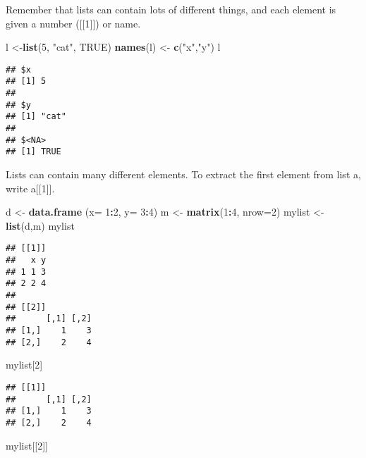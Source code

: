 \documentclass[
]{article}
\newenvironment{Shaded}{\begin{snugshade}}{\end{snugshade}}
\newcommand{\DataTypeTok}[1]{\textcolor[rgb]{0.13,0.29,0.53}{#1}}
\newcommand{\DecValTok}[1]{\textcolor[rgb]{0.00,0.00,0.81}{#1}}
\newcommand{\KeywordTok}[1]{\textcolor[rgb]{0.13,0.29,0.53}{\textbf{#1}}}
\newcommand{\NormalTok}[1]{#1}
\newcommand{\OperatorTok}[1]{\textcolor[rgb]{0.81,0.36,0.00}{\textbf{#1}}}
\newcommand{\OtherTok}[1]{\textcolor[rgb]{0.56,0.35,0.01}{#1}}
\newcommand{\StringTok}[1]{\textcolor[rgb]{0.31,0.60,0.02}{#1}}
\begin{document}
Remember that lists can contain lots of different things, and each
element is given a number ({[}{[}1{]}{]}) or name.

\begin{Shaded}
\begin{Highlighting}[]
\NormalTok{l <-}\KeywordTok{list}\NormalTok{(}\DecValTok{5}\NormalTok{, }\StringTok{"cat"}\NormalTok{, }\OtherTok{TRUE}\NormalTok{)}
\KeywordTok{names}\NormalTok{(l) <-}\StringTok{ }\KeywordTok{c}\NormalTok{(}\StringTok{"x"}\NormalTok{,}\StringTok{"y"}\NormalTok{)}
\NormalTok{l}
\end{Highlighting}
\end{Shaded}

\begin{verbatim}
## $x
## [1] 5
## 
## $y
## [1] "cat"
## 
## $<NA>
## [1] TRUE
\end{verbatim}

Lists can contain many different elements. To extract the first element
from list a, write a{[}{[}1{]}{]}.

\begin{Shaded}
\begin{Highlighting}[]
\NormalTok{d <-}\StringTok{ }\KeywordTok{data.frame}\NormalTok{ (}\DataTypeTok{x=} \DecValTok{1}\OperatorTok{:}\DecValTok{2}\NormalTok{, }\DataTypeTok{y=} \DecValTok{3}\OperatorTok{:}\DecValTok{4}\NormalTok{)}
\NormalTok{m <-}\StringTok{ }\KeywordTok{matrix}\NormalTok{(}\DecValTok{1}\OperatorTok{:}\DecValTok{4}\NormalTok{, }\DataTypeTok{nrow=}\DecValTok{2}\NormalTok{)}
\NormalTok{mylist <-}\StringTok{ }\KeywordTok{list}\NormalTok{(d,m)}
\NormalTok{mylist}
\end{Highlighting}
\end{Shaded}

\begin{verbatim}
## [[1]]
##   x y
## 1 1 3
## 2 2 4
## 
## [[2]]
##      [,1] [,2]
## [1,]    1    3
## [2,]    2    4
\end{verbatim}

\begin{Shaded}
\begin{Highlighting}[]
\NormalTok{mylist[}\DecValTok{2}\NormalTok{]}
\end{Highlighting}
\end{Shaded}

\begin{verbatim}
## [[1]]
##      [,1] [,2]
## [1,]    1    3
## [2,]    2    4
\end{verbatim}

\begin{Shaded}
\begin{Highlighting}[]
\NormalTok{mylist[[}\DecValTok{2}\NormalTok{]]}
\end{Highlighting}
\end{Shaded}
\end{document}
